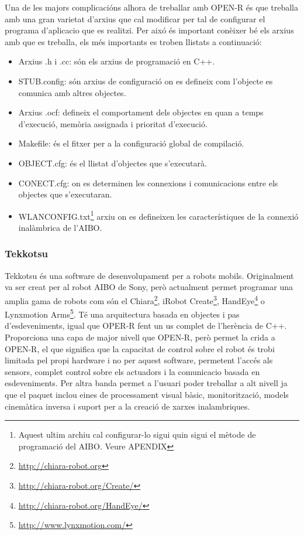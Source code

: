\documentclass[12pt,a4paper,final,twoside]{article}
\begin{document}
Una de les majors complicacións alhora de treballar amb OPEN-R és que treballa amb una gran varietat d'arxius que cal modificar per tal de configurar el programa d'aplicacio que es realitzi. Per aixó és important conèixer bé els arxius amb que es treballa, els més importants es troben llistats a continuació:
\begin{itemize}
\item Arxius .h i .cc: són els arxius de programació en C++.
\item STUB.config: són arxius de configuració on es defineix com l'objecte es comunica amb altres objectes.
\item Arxius .ocf: defineix el comportament dels objectes en quan a temps d'execució, memòria assignada i prioritat d'execució.
\item Makefile: és el fitxer per a la configuració global de compilació.
\item OBJECT.cfg: és el llistat d'objectes que s'executarà.
\item CONECT.cfg: on es determinen les connexions i comunicacions entre els objectes que s'executaran.
\item WLANCONFIG.txt\footnote{Aquest ultim archiu cal configurar-lo sigui quin sigui el mètode de programació del AIBO. Veure APENDIX} arxiu on es defineixen les característiques de la connexió inalàmbrica de l'AIBO.


\end{itemize}
\subsubsection{Tekkotsu}
Tekkotsu és una software de desenvolupament per a robots mobils. Originalment va ser creat per al robot AIBO de Sony, però actualment permet programar una amplia gama de robots com són el Chiara\footnote{\url{http://chiara-robot.org}}, iRobot Create\footnote{\url{http://chiara-robot.org/Create/}}, HandEye\footnote{\url{http://chiara-robot.org/HandEye/}} o Lynxmotion Arms\footnote{\url{http://www.lynxmotion.com/}}. Té una arquitectura basada en objectes i pas d'esdeveniments, igual que OPER-R fent un us complet de l'herència de C++. Proporciona una capa de major nivell que OPEN-R, però permet la crida a OPEN-R, el que significa que la capacitat de control sobre el robot és trobi limitada pel propi hardware i no per aquest software, permetent l'accés als sensors, complet control sobre els actuadors i la comunicacio basada en esdeveniments. Per altra banda permet a l'usuari poder treballar a alt nivell ja que el paquet inclou eines de processament visual bàsic, monitorització, models cinemàtica inversa i suport per a la creació de xarxes inalambriques. 
\end{document}
